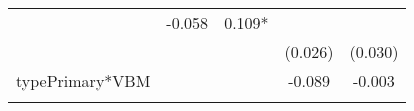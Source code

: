 \documentclass[12pt,twoside]{reedthesis}
\begin{document}
\begin{longtable}[]{@{}lcccc@{}}
\begin{minipage}[t]{0.13\columnwidth}
  \strut
  \end{minipage} & \begin{minipage}[t]{0.14\columnwidth}\centering\strut
  -0.058\strut
  \end{minipage} & \begin{minipage}[t]{0.14\columnwidth}\centering\strut
  0.109*\strut
  \end{minipage}\tabularnewline
  \begin{minipage}[t]{0.26\columnwidth}\raggedright\strut
  \strut
  \end{minipage} & \begin{minipage}[t]{0.12\columnwidth}\centering\strut
  \strut
  \end{minipage} & \begin{minipage}[t]{0.13\columnwidth}\centering\strut
  \strut
  \end{minipage} & \begin{minipage}[t]{0.14\columnwidth}\centering\strut
  (0.026)\strut
  \end{minipage} & \begin{minipage}[t]{0.14\columnwidth}\centering\strut
  (0.030)\strut
  \end{minipage}\tabularnewline
  \begin{minipage}[t]{0.26\columnwidth}\raggedright\strut
  typePrimary*VBM\strut
  \end{minipage} & \begin{minipage}[t]{0.12\columnwidth}\centering\strut
  \strut
  \end{minipage} & \begin{minipage}[t]{0.13\columnwidth}\centering\strut
  \strut
  \end{minipage} & \begin{minipage}[t]{0.14\columnwidth}\centering\strut
  -0.089\strut
  \end{minipage} & \begin{minipage}[t]{0.14\columnwidth}\centering\strut
  -0.003\strut
  \end{minipage}\tabularnewline
  \begin{minipage}[t]{0.26\columnwidth}\raggedright\strut
  \strut
  \end{minipage} & \begin{minipage}[t]{0.12\columnwidth}\centering\strut
  \strut
  \end{minipage} & \begin{minipage}[t]{0.13\columnwidth}\centering\strut
  \strut
  \end{minipage} & \begin{minipage}[t]{0.14\columnwidth}\centering\strut

\end{minipage}
\end{longtable}
\end{document}
